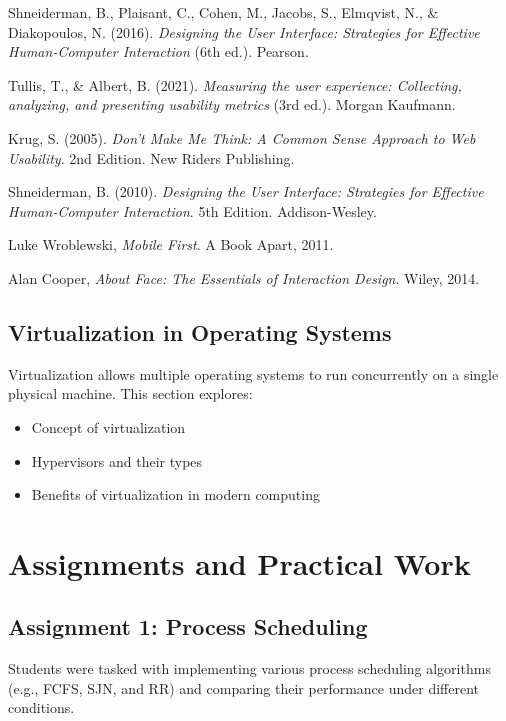 \documentclass[12pt]{article}
\begin{document}
\begin{thebibliography}{9} 
Shneiderman, B., Plaisant, C., Cohen, M., Jacobs, S., Elmqvist, N., \& Diakopoulos, N. (2016). \textit{Designing the User Interface: Strategies for Effective Human-Computer Interaction} (6th ed.). Pearson.

Tullis, T., \& Albert, B. (2021). \textit{Measuring the user experience: Collecting, analyzing, and presenting usability metrics} (3rd ed.). Morgan Kaufmann.

Krug, S. (2005). \textit{Don't Make Me Think: A Common Sense Approach to Web Usability}. 2nd Edition. New Riders Publishing.

Shneiderman, B. (2010). \textit{Designing the User Interface: Strategies for Effective Human-Computer Interaction}. 5th Edition. Addison-Wesley.

Luke Wroblewski, \emph{Mobile First}. A Book Apart, 2011.

Alan Cooper, \emph{About Face: The Essentials of Interaction Design}. Wiley, 2014.


\end{thebibliography}

\subsection{Virtualization in Operating Systems}
Virtualization allows multiple operating systems to run concurrently on a single physical machine. This section explores:
\begin{itemize}
    \item Concept of virtualization
    \item Hypervisors and their types
    \item Benefits of virtualization in modern computing
\end{itemize}

\section{Assignments and Practical Work}
\subsection{Assignment 1: Process Scheduling}
Students were tasked with implementing various process scheduling algorithms (e.g., FCFS, SJN, and RR) and comparing their performance under different conditions.
\end{document}
